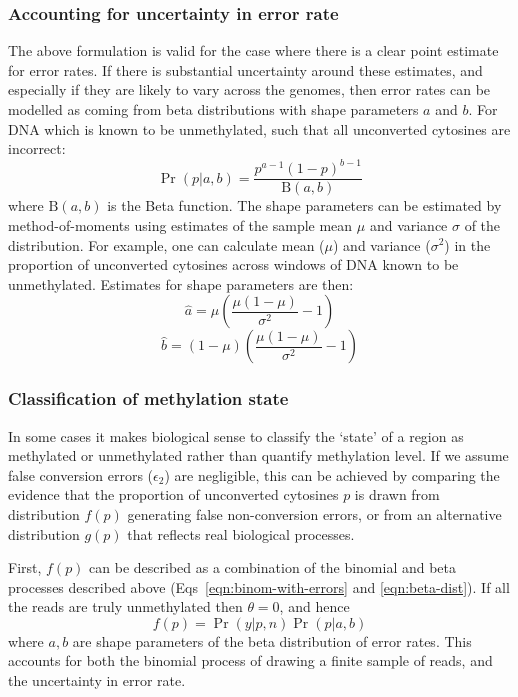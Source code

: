 \documentclass[10pt,draft,letterpaper]{article}
\begin{document}
\subsubsection*{Accounting for uncertainty in error rate} \label{sec:mean-as-beta}

The above formulation is valid for the case where there is a clear point estimate for error rates.
If there is substantial uncertainty around these estimates, and especially if they are likely to vary across the genomes, then error rates can be modelled as coming from beta distributions with shape parameters $a$ and $b$. For DNA which is known to be unmethylated, such that all unconverted cytosines are incorrect:
\begin{equation}
    \label{eqn:beta-dist}
    \Pr(p|a,b) = \frac{p^{a-1} (1-p)^{b-1}}{\textrm{B}(a,b)}
\end{equation}
where $\textrm{B}(a,b)$ is the Beta function.
The shape parameters can be estimated by method-of-moments using estimates of the sample mean $\mu$ and variance $\sigma$ of the distribution.
For example, one can calculate mean ($\mu$) and variance ($\sigma^2$) in the proportion of unconverted cytosines across windows of DNA known to be unmethylated.
Estimates for shape parameters are then:
\begin{equation}
    \hat{a} = \mu(\frac{\mu(1-\mu)}{\sigma^2}-1)
    \label{eqn:beta-a}
\end{equation}
\begin{equation}
    \hat{b} = (1-\mu)(\frac{\mu(1-\mu)}{\sigma^2}-1) 
    \label{eqn:beta-b}
\end{equation}

\subsubsection*{Classification of methylation state} \label{sec:meth-state}

In some cases it makes biological sense to classify the `state' of a region as methylated or unmethylated rather than quantify methylation level.
If we assume false conversion errors ($\epsilon_2$) are negligible, this can be achieved by comparing the evidence that the proportion of unconverted cytosines $p$ is drawn from distribution $f(p)$ generating false non-conversion errors, or from an alternative distribution $g(p)$ that reflects real biological processes.

First, $f(p)$ can be described as a combination of the binomial and beta processes described above (Eqs~\ref{eqn:binom-with-errors} and \ref{eqn:beta-dist}).
If all the reads are truly unmethylated then $\theta=0$, and hence
\begin{equation}
    f(p) = \Pr(y | p, n) \Pr(p | a, b)
    \label{eqn:f-of-p}
\end{equation}
where $a, b$ are shape parameters of the beta distribution of error rates.
This accounts for both the binomial process of drawing a finite sample of reads, and the uncertainty in error rate.
\end{document}
